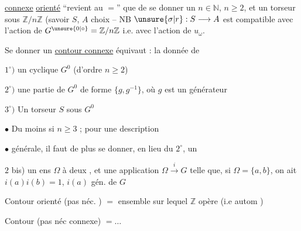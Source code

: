 \uline{connexe} \uline{orienté} ``revient au $=$'' que de se donner un $n\in\mathbb{N}$, $n\geq2$, et un  torseur sous $\mathbb{Z}/n\mathbb{Z}$ (savoir $S$,  $A$  choix -- NB $\unsure{\sigma|r}:S\longrightarrow A$ est compatible avec l'action de $G^{\unsure{0|\circ}}=\mathbb{Z}/n\mathbb{Z}$ i.e. avec l'action de $u_{\omega}$.

Se donner un \uline{contour connexe} équivaut : la donnée de

$1^{\circ})$ un  cyclique $G^{0}$ (d'ordre $n\geq2$)

$2^{\circ})$ une  partie de $G^{0}$  de  forme $\{g,g^{-1}\}$, où $g$ est un générateur 

$3^{\circ})$ Un torseur $S$ sous $G^{0}$

$\bullet$ Du moins si $n\geq3$  ; pour une description

$\bullet$ générale, il faut de plus se donner, en lieu du $2^{\circ}$, un

$2$ bis) un ens $\Omega$ à deux , et une application $\Omega\xrightarrow{i}G$ telle que, si $\Omega=\{a,b\}$, on ait $i(a)i(b)=1$, $i(a)$ gén. de $G$


Contour orienté (pas néc. ) $=$ ensemble sur lequel $\mathbb{Z}$ opère (i.e  autom )

Contour (pas néc connexe) $=\ldots$
